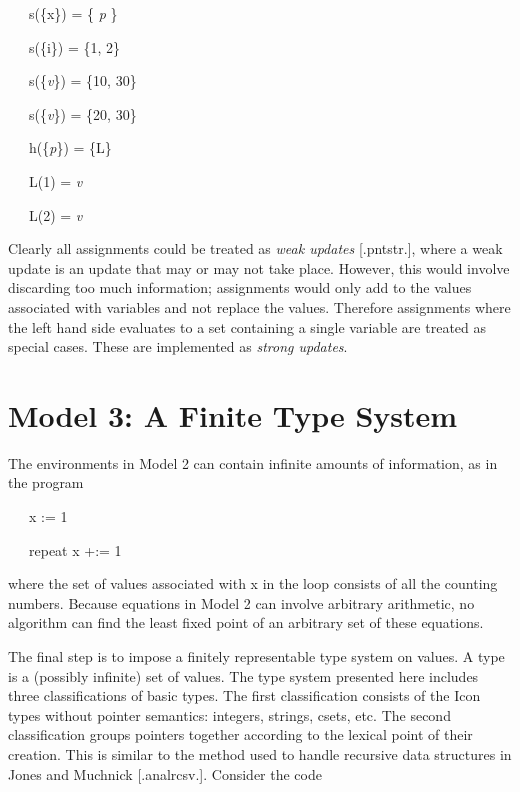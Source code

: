 {\ttfamily\mdseries
\ \ \ s(\{x\}) = \{ \textit{p}\textit{} \}}

{\ttfamily\mdseries
\ \ \ s(\{i\}) = \{1, 2\}}

{\ttfamily\mdseries
\ \ \ s(\{\textit{v}\textit{}\}) = \{10, 30\}}

{\ttfamily\mdseries
\ \ \ s(\{\textit{v}\textit{}\}) = \{20, 30\}}


\bigskip

{\ttfamily\mdseries
\ \ \ h(\{\textit{p}\textit{}\}) = \{L\}}


\bigskip

{\ttfamily\mdseries
\ \ \ L(1) = \textit{v}\textit{}}

{\ttfamily\mdseries
\ \ \ L(2) = \textit{v}\textit{}}


Clearly all assignments could be treated as \textit{weak updates}
[.pntstr.], where a weak update is an update that may or may not take
place. However, this would involve discarding too much information;
assignments would only add to the values associated with variables and
not replace the values. Therefore assignments where the left hand side
evaluates to a set containing a single variable are treated as special
cases. These are implemented as \textit{strong updates}.

\section{Model 3: A Finite Type System}

The environments in Model 2 can contain infinite amounts of
information, as in the program

{\ttfamily\mdseries
\ \ \ x := 1}

{\ttfamily\mdseries
\ \ \ repeat x +:= 1}

\noindent where the set of values associated with x in the loop
consists of all the counting numbers. Because equations in Model 2 can
involve arbitrary arithmetic, no algorithm can find the least fixed
point of an arbitrary set of these equations.

The final step is to impose a finitely representable type system on
values. A type is a (possibly infinite) set of values. The type system
presented here includes three classifications of basic types. The
first classification consists of the Icon types without pointer
semantics: integers, strings, csets, etc. The second classification
groups pointers together according to the lexical point of their
creation. This is similar to the method used to handle recursive data
structures in Jones and Muchnick [.analrcsv.]. Consider the code

